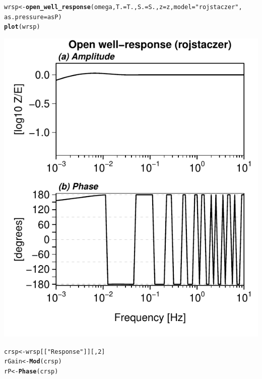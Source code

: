 \documentclass[12pt]{article}\usepackage[]{graphicx}\usepackage[]{color}
\makeatletter
\def\maxwidth{ %
  \ifdim\Gin@nat@width>\linewidth
    \linewidth
  \else
    \Gin@nat@width
  \fi
}
\newcommand{\hlnum}[1]{\textcolor[rgb]{0.686,0.059,0.569}{#1}}%
\newcommand{\hlstr}[1]{\textcolor[rgb]{0.192,0.494,0.8}{#1}}%
\newcommand{\hlstd}[1]{\textcolor[rgb]{0.345,0.345,0.345}{#1}}%
\newcommand{\hlkwb}[1]{\textcolor[rgb]{0.69,0.353,0.396}{#1}}%
\newcommand{\hlkwc}[1]{\textcolor[rgb]{0.333,0.667,0.333}{#1}}%
\newcommand{\hlkwd}[1]{\textcolor[rgb]{0.737,0.353,0.396}{\textbf{#1}}}%
\newenvironment{kframe}{%
 \def\at@end@of@kframe{}%
 \ifinner\ifhmode%
  \def\at@end@of@kframe{\end{minipage}}%
  \begin{minipage}{\columnwidth}%
 \fi\fi%
 \def\FrameCommand##1{\hskip\@totalleftmargin \hskip-\fboxsep
 \colorbox{shadecolor}{##1}\hskip-\fboxsep
     \hskip-\linewidth \hskip-\@totalleftmargin \hskip\columnwidth}%
 \MakeFramed {\advance\hsize-\width
   \@totalleftmargin\z@ \linewidth\hsize
   \@setminipage}}%
 {\par\unskip\endMakeFramed%
 \at@end@of@kframe}
\newenvironment{knitrout}{}{} %
\makeatother
\begin{document}
\begin{knitrout}\small
{}\color{fgcolor}\begin{kframe}
\begin{alltt}
\hlstd{wrsp} \hlkwb{<-} \hlkwd{open_well_response}\hlstd{(omega,} \hlkwc{T.} \hlstd{= T.,} \hlkwc{S.} \hlstd{= S.,} \hlkwc{z} \hlstd{= z,} \hlkwc{model} \hlstd{=} \hlstr{"rojstaczer"}\hlstd{,}
    \hlkwc{as.pressure} \hlstd{= asP)}
\hlkwd{plot}\hlstd{(wrsp)}
\end{alltt}
\end{kframe}
\includegraphics[width=\maxwidth]{figure/ROJRESP} 
\begin{kframe}\begin{alltt}
\hlstd{crsp} \hlkwb{<-} \hlstd{wrsp[[}\hlstr{"Response"}\hlstd{]][,} \hlnum{2}\hlstd{]}
\hlstd{rGain} \hlkwb{<-} \hlkwd{Mod}\hlstd{(crsp)}
\hlstd{rP} \hlkwb{<-} \hlkwd{Phase}\hlstd{(crsp)}
\end{alltt}
\end{kframe}
\end{knitrout}
\end{document}

